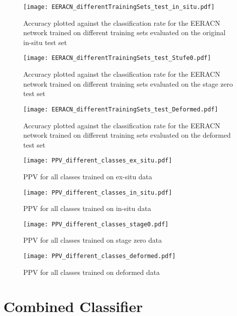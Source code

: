 \begin{figure}
  \texttt{[image: EERACN\_differentTrainingSets\_test\_in\_situ.pdf]}
\caption{Accuracy plotted against the classification rate for the EERACN network trained on different training sets evaluated on the original in-situ test set}
\label{fig:TPR_comparison}
\end{figure}

\begin{figure}
  \texttt{[image: EERACN\_differentTrainingSets\_test\_Stufe0.pdf]}
\caption{Accuracy plotted against the classification rate for the EERACN network trained on different training sets evaluated on the stage zero test set}
\label{fig:TPR_comparison}
\end{figure}

\begin{figure}
  \texttt{[image: EERACN\_differentTrainingSets\_test\_Deformed.pdf]}
\caption{Accuracy plotted against the classification rate for the EERACN network trained on different training sets evaluated on the deformed test set}
\label{fig:TPR_comparison}
\end{figure}

\begin{figure}
  \texttt{[image: PPV\_different\_classes\_ex\_situ.pdf]}
\caption{PPV for all classes trained on ex-situ data}
\label{fig:TPR_comparison}
\end{figure}

\begin{figure}
  \texttt{[image: PPV\_different\_classes\_in\_situ.pdf]}
\caption{PPV for all classes trained on in-situ data}
\label{fig:TPR_comparison}
\end{figure}

\begin{figure}
  \texttt{[image: PPV\_different\_classes\_stage0.pdf]}
\caption{PPV for all classes trained on stage zero data}
\label{fig:TPR_comparison}
\end{figure}

\begin{figure}
  \texttt{[image: PPV\_different\_classes\_deformed.pdf]}
\caption{PPV for all classes trained on deformed data }
\label{fig:TPR_comparison}
\end{figure}


\section{Combined Classifier}

